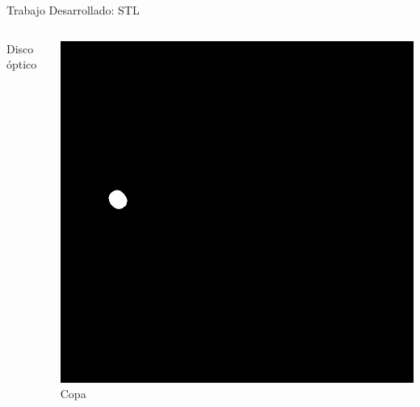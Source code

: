 \documentclass[xcolor=dvipsnames,table]{beamer}
\begin{document}
\begin{frame}{Trabajo Desarrollado: STL}
\begin{columns}[T]
\begin{minipage}[t]{0.35\textwidth}
		{\small Disco óptico}
	\end{minipage}\hfill
	\begin{minipage}[t]{0.35\textwidth}
		\centering
		\includegraphics[width=\textwidth]{my_images/ML/n0109_cup.png}\\[1ex]
		{\small \mbox{Copa}}
	\end{minipage}
	
	\vspace{1em} %
	
		\centering
	\begin{minipage}[t]{0.35\textwidth}
	

\end{minipage}
\end{columns}
\end{frame}
\end{document}
